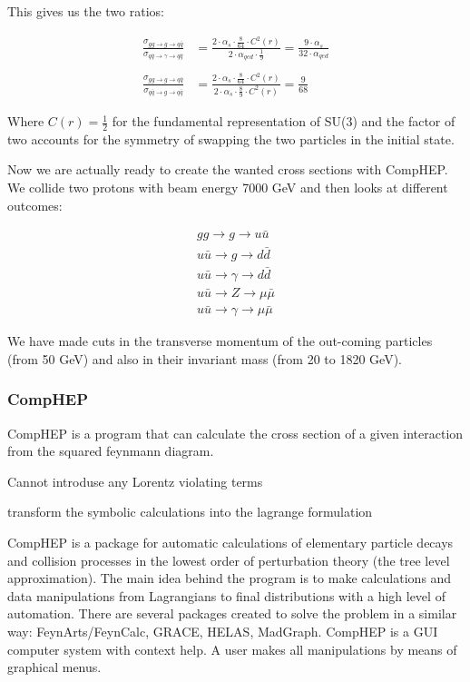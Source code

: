 This gives us the two ratios:

\begin{align}
	\frac{\sigma_{gg \rightarrow g \rightarrow q \bar q}}{\sigma_{q \bar q \rightarrow \gamma \rightarrow q \bar q}} &=\frac{2 \cdot \alpha_{s} \cdot \frac{8}{64} \cdot C^{2}(r)}{2 \cdot \alpha_{qed} \cdot \frac{1}{9}}=\frac{9 \cdot  \alpha_{s} }{32 \cdot  \alpha_{qed} }\\ \nonumber \\
	\frac{\sigma_{gg \rightarrow g \rightarrow q \bar q}}{\sigma_{q \bar q \rightarrow g \rightarrow q \bar q}} &=\frac{2 \cdot \alpha_{s} \cdot \frac{8}{64} \cdot C^{2}(r)}{2 \cdot \alpha_{s} \cdot \frac{8}{9} \cdot C^{2}(r)}=\frac{9}{68}
\end{align}

Where $C(r) = \frac{1}{2}$ for the fundamental representation of SU(3) and the factor of two accounts for the symmetry of swapping the two particles in the initial state.

Now we are actually ready to create the wanted cross sections with CompHEP. We collide two protons with beam energy 7000 GeV and then looks at different outcomes:

\begin{align}
gg \rightarrow g \rightarrow u \bar u \nonumber \\ \nonumber
u \bar u \rightarrow g \rightarrow d \bar d \\ \nonumber
u \bar u \rightarrow \gamma \rightarrow d \bar d \\ \nonumber
u \bar u \rightarrow Z \rightarrow \mu \bar \mu \\ \nonumber
u \bar u \rightarrow \gamma \rightarrow \mu \bar \mu 
\end{align}

We have made cuts in the transverse momentum of the out-coming particles (from 50 GeV) and also in their invariant mass (from 20 to 1820 GeV). 


\subsubsection{CompHEP}
CompHEP is a program that can calculate the cross section of a given interaction from the squared feynmann diagram.

Cannot introduse any Lorentz violating terms

transform the symbolic calculations into the lagrange formulation


 CompHEP is a package for automatic calculations of elementary particle decays and collision processes in the lowest order of perturbation theory (the tree level approximation). The main idea behind the program is to make calculations and data manipulations from Lagrangians to final distributions with a high level of automation. There are several packages created to solve the problem in a similar way: FeynArts/FeynCalc, GRACE, HELAS, MadGraph. CompHEP is a GUI computer system with context help. A user makes all manipulations by means of graphical menus.

